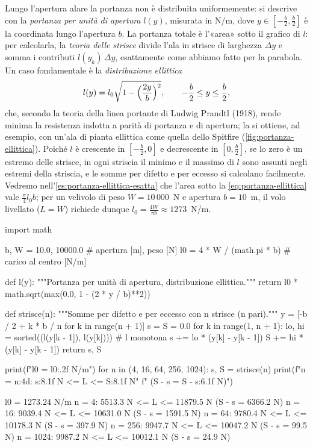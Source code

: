 \begin{idea}
Lungo l'apertura alare la portanza non è distribuita uniformemente: si descrive con la
\emph{portanza per unità di apertura} $l(y)$, misurata in N/m, dove $y\in[-\frac b2,
\frac b2]$ è la coordinata lungo l'apertura $b$. La portanza totale è l'«area» sotto il
grafico di $l$: per calcolarla, la \emph{teoria delle strisce} divide l'ala in strisce
di larghezza $\Delta y$ e somma i contributi $l(y_{k})\,\Delta y$, esattamente come
abbiamo fatto per la parabola. Un caso fondamentale è la \emph{distribuzione
ellittica}
\begin{equation}\label{eq:portanza-ellittica}
  l(y)=l_{0}\sqrt{1-\Bigl(\frac{2y}b\Bigr)^{2}}, \qquad -\frac b2\le y\le\frac b2,
\end{equation}
che, secondo la teoria della linea portante di Ludwig Prandtl (1918), rende minima la
resistenza indotta a parità di portanza e di apertura; la si ottiene, ad esempio, con
un'ala di pianta ellittica come quella dello Spitfire (\cref{fig:portanza-ellittica}).
Poiché $l$ è crescente in $[-\frac b2,0]$ e decrescente in $[0,\frac b2]$, se lo zero è
un estremo delle strisce, in ogni striscia il minimo e il massimo di $l$ sono assunti
negli estremi della striscia, e le somme per difetto e per eccesso si calcolano
facilmente. Vedremo nell'\cref{es:portanza-ellittica-esatta} che l'area sotto la
\eqref{eq:portanza-ellittica} vale $\frac\pi4l_{0}b$; per un velivolo di peso
$W=10\,000$~N e apertura $b=10$~m, il volo livellato ($L=W$) richiede dunque
$l_{0}=\frac{4W}{\pi b}\approx1273$~N/m.
\end{idea}

\begin{python}
import math

b, W = 10.0, 10000.0                  # apertura [m], peso [N]
l0 = 4 * W / (math.pi * b)            # carico al centro [N/m]

def l(y):
    """Portanza per unità di apertura, distribuzione ellittica."""
    return l0 * math.sqrt(max(0.0, 1 - (2 * y / b)**2))

def strisce(n):
    """Somme per difetto e per eccesso con n strisce (n pari)."""
    y = [-b / 2 + k * b / n for k in range(n + 1)]
    s = S = 0.0
    for k in range(1, n + 1):
        lo, hi = sorted((l(y[k - 1]), l(y[k])))  # l monotona
        s += lo * (y[k] - y[k - 1])
        S += hi * (y[k] - y[k - 1])
    return s, S

print(f"l0 = {l0:.2f} N/m")
for n in (4, 16, 64, 256, 1024):
    s, S = strisce(n)
    print(f"n = {n:4d}: {s:8.1f} N <= L <= {S:8.1f} N"
          f"   (S - s = {S - s:6.1f} N)")
\end{python}
\begin{risultato}
l0 = 1273.24 N/m
n =    4:   5513.3 N <= L <=  11879.5 N   (S - s = 6366.2 N)
n =   16:   9039.4 N <= L <=  10631.0 N   (S - s = 1591.5 N)
n =   64:   9780.4 N <= L <=  10178.3 N   (S - s =  397.9 N)
n =  256:   9947.7 N <= L <=  10047.2 N   (S - s =   99.5 N)
n = 1024:   9987.2 N <= L <=  10012.1 N   (S - s =   24.9 N)
\end{risultato}

